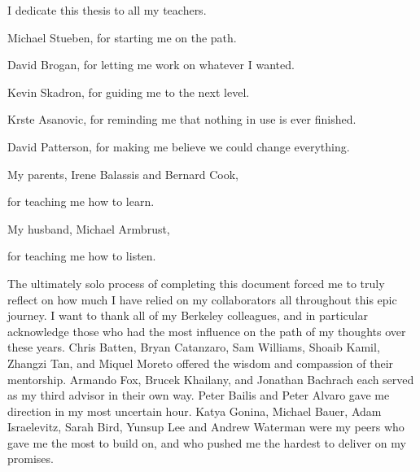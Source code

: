 \documentclass[12pt]{myucthesis}
\begin{document}
\hypersetup{pageanchor=true}
\begin{frontmatter}

\begin{dedication}
\null\vfil
{\large
\begin{center}
I dedicate this thesis to all my teachers.
\vspace{1in}

Michael Stueben, for starting me on the path.

David Brogan, for letting me work on whatever I wanted.

Kevin Skadron, for guiding me to the next level.

Krste Asanovic, for reminding me that nothing in use is ever finished.

David Patterson, for making me believe we could change everything.
\vspace{1in}

My parents, Irene Balassis and Bernard Cook,

for teaching me how to learn.
\vspace{1in}

My husband, Michael Armbrust,

for teaching me how to listen.

\end{center}}
\null\vfil
\end{dedication}

\tableofcontents
\listoffigures %
\listoftables %


\begin{acknowledgements}

The ultimately solo process of completing this document forced me to truly reflect
on how much I have relied on my collaborators all throughout this epic journey.
I want to thank all of my Berkeley colleagues, and in particular acknowledge
those who had the most influence on the path of my thoughts over these years.
Chris Batten, Bryan Catanzaro, Sam Williams, Shoaib Kamil, Zhangzi Tan, and Miquel Moreto
offered the wisdom and compassion of their mentorship.
Armando Fox, Brucek Khailany, and Jonathan Bachrach each served as my third advisor in their own way.
Peter Bailis and Peter Alvaro gave me direction in my most uncertain hour.
Katya Gonina, Michael Bauer, Adam Israelevitz,
Sarah Bird, Yunsup Lee and Andrew Waterman
were my peers who gave me the most to build on,
and who pushed me the hardest to deliver on my promises.


\end{acknowledgements}
\end{frontmatter}
\end{document}
